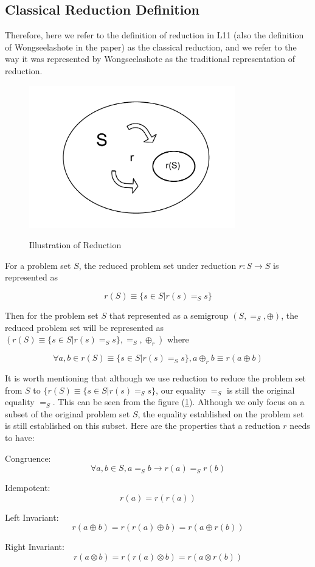 \documentclass[a4paper,12pt,twoside,openright]{report}
\newcommand{\e}[2]{
\begin{equation}
  \label{#1} 
  #2
\end{equation}
}
\begin{document}
\subsection{Classical Reduction Definition}
Therefore, here we refer to the definition of reduction in L11 (also the definition of Wongseelashote in the paper) as the classical reduction, and we refer to the way it was represented by Wongseelashote as the traditional representation of reduction.
\begin{figure}[H]
\centering
\includegraphics[width=0.8\textwidth]{reduction.pdf}
\label{reduction}
\caption{Illustration of Reduction}
\end{figure}
For a problem set $S$, the reduced problem set under reduction $r: S \rightarrow S$ is represented as 
\e{r:def:traditional}{r(S) \equiv \{s \in S | r(s) =_S s\}}
Then for the problem set $S$ that represented as a semigroup $(S,=_S,\oplus)$, the reduced problem set will be represented as $({r(S) \equiv \{s \in S | r(s) =_S s\}},=_S,\oplus_r)$ where 
\e{r:def:binary_operator}{\forall a, b \in r(S) \equiv \{s \in S | r(s) =_S s\}, a \oplus_r b \equiv r(a \oplus b)}
It is worth mentioning that although we use reduction to reduce the problem set from $S$ to $\{r(S) \equiv \{s \in S | r(s) =_S s\}$, our equality $=_S$ is still the original equality $=_S$. 
This can be seen from the figure (\ref{reduction}). Although we only focus on a subset of the original problem set $S$, the equality established on the problem set is still established on this subset. 
Here are the properties that a reduction $r$ needs to have:

Congruence: \e{r:def:congruence}{\forall a,b \in S, a =_S b \rightarrow r(a) =_S r(b)}
Idempotent: \e{r:def:idempotent}{r(a) = r(r(a))} 
Left Invariant: \e{r:def:left_invariant}{r(a\oplus b) = r(r(a)\oplus b) = r(a\oplus r(b))}
Right Invariant: \e{r:def:right_invariant}{r(a\otimes b) = r(r(a)\otimes b) = r(a\otimes r(b))}
\end{document}
